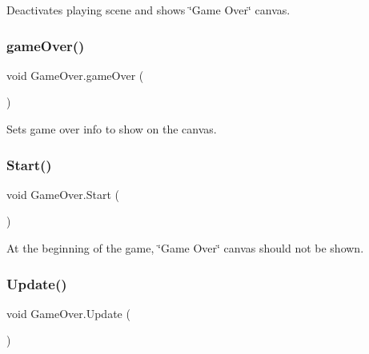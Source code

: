 Deactivates playing scene and shows \char`\"{}\+Game Over\char`\"{} canvas. 

\mbox{\label{class_game_over_a03d824dff5b997d7566f5e7bb5326609}} 
\subsubsection{\texorpdfstring{game\+Over()}{gameOver()}}
{\footnotesize\ttfamily void Game\+Over.\+game\+Over (\begin{DoxyParamCaption}{ }\end{DoxyParamCaption})}



Sets game over info to show on the canvas. 

\mbox{\label{class_game_over_a568be230765aad02fc07c3ff2d655e41}} 
\subsubsection{\texorpdfstring{Start()}{Start()}}
{\footnotesize\ttfamily void Game\+Over.\+Start (\begin{DoxyParamCaption}{ }\end{DoxyParamCaption})\hspace{0.3cm}{\ttfamily [private]}}



At the beginning of the game, \char`\"{}\+Game Over\char`\"{} canvas should not be shown. 

\mbox{\label{class_game_over_ab9acefb17781e10acace7ea576d48d63}} 
\subsubsection{\texorpdfstring{Update()}{Update()}}
{\footnotesize\ttfamily void Game\+Over.\+Update (\begin{DoxyParamCaption}{ }\end{DoxyParamCaption})\hspace{0.3cm}{\ttfamily [private]}}



